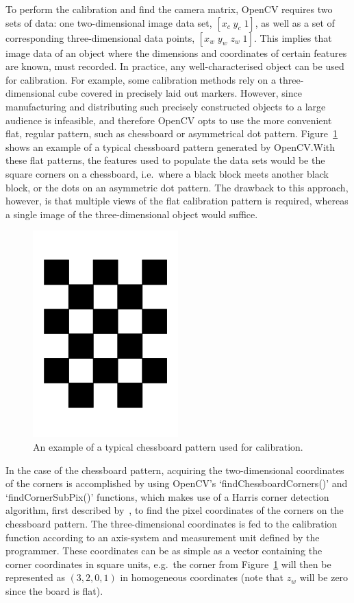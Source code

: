 To perform the calibration and find the camera matrix, OpenCV requires two sets of data: one two-dimensional image data set, $[x_c\;y_c\;1]$, as well as a set of corresponding three-dimensional data points, $[x_w\;y_w\;z_w\;1]$. This implies that image data of an object where the dimensions and coordinates of certain features are known, must recorded. In practice, any well-characterised object can be used for calibration. For example, some calibration methods rely on a three-dimensional cube covered in precisely laid out markers. However, since manufacturing and distributing such precisely constructed objects to a large audience is infeasible, and therefore OpenCV opts to use the more convenient flat, regular pattern, such as chessboard or asymmetrical dot pattern. Figure~\ref{fig:chap2-calib-pattern} shows an example of a typical chessboard pattern generated by OpenCV.\@ With these flat patterns, the features used to populate the data sets would be the square corners on a chessboard, i.e.\ where a black block meets another black block, or the dots on an asymmetric dot pattern. The drawback to this approach, however, is that multiple views of the flat calibration pattern is required, whereas a single image of the three-dimensional object would suffice. 

\begin{figure}
  \centering
  \includegraphics[angle=90, width=0.5\textwidth]{figures/chapter2/chessboard_pattern}
  \caption{An example of a typical chessboard pattern used for calibration.}
\label{fig:chap2-calib-pattern}
\end{figure}

In the case of the chessboard pattern, acquiring the two-dimensional coordinates of the corners is accomplished by using OpenCV's `findChessboardCorners()' and `findCornerSubPix()' functions, which makes use of a Harris corner detection algorithm, first described by~\cite{harris1988combined}, to find the pixel coordinates of the corners on the chessboard pattern. The three-dimensional coordinates is fed to the calibration function according to an axis-system and measurement unit defined by the programmer. These coordinates can be as simple as a vector containing the corner coordinates in square units, e.g.\ the corner from Figure~\ref{fig:chap2-calib-pattern} will then be represented as $(3, 2, 0, 1)$ in homogeneous coordinates (note that $z_w$ will be zero since the board is flat). 


